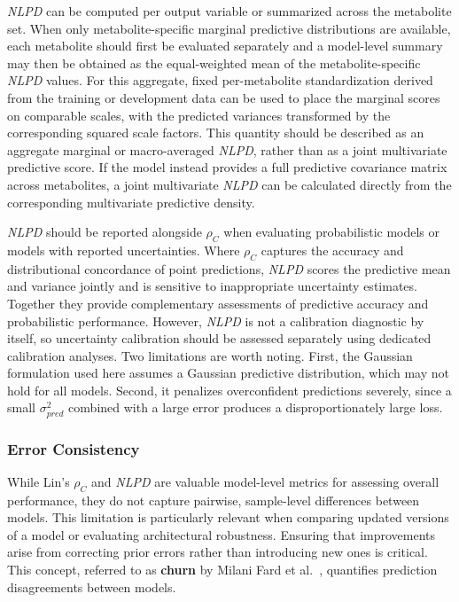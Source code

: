\textit{NLPD} can be computed per output variable or summarized across the metabolite set. When only metabolite-specific marginal predictive distributions are available, each metabolite should first be evaluated separately and a model-level summary may then be obtained as the equal-weighted mean of the metabolite-specific \textit{NLPD} values. For this aggregate, fixed per-metabolite standardization derived from the training or development data can be used to place the marginal scores on comparable scales, with the predicted variances transformed by the corresponding squared scale factors. This quantity should be described as an aggregate marginal or macro-averaged \textit{NLPD}, rather than as a joint multivariate predictive score. If the model instead provides a full predictive covariance matrix across metabolites, a joint multivariate \textit{NLPD} can be calculated directly from the corresponding multivariate predictive density.

\textit{NLPD} should be reported alongside $\rho_C$ when evaluating probabilistic models or models with reported uncertainties. Where $\rho_C$ captures the accuracy and distributional concordance of point predictions, \textit{NLPD} scores the predictive mean and variance jointly and is sensitive to inappropriate uncertainty estimates. Together they provide complementary assessments of predictive accuracy and probabilistic performance. However, \textit{NLPD} is not a calibration diagnostic by itself, so uncertainty calibration should be assessed separately using dedicated calibration analyses. Two limitations are worth noting. First, the Gaussian formulation used here assumes a Gaussian predictive distribution, which may not hold for all \DL models. Second, it penalizes overconfident predictions severely, since a small $\sigma^2_{pred}$ combined with a large error produces a disproportionately large loss.

\subsubsection{Error Consistency}\label{sec:Eval:subsec:RegMetrics:subsubsec:error con}
While Lin's $\rho_C$ and \textit{NLPD} are valuable model-level metrics for assessing overall performance, they do not capture pairwise, sample-level differences between models. This limitation is particularly relevant when comparing updated versions of a model or evaluating architectural robustness. Ensuring that improvements arise from correcting prior errors rather than introducing new ones is critical. This concept, referred to as \textbf{churn} by Milani Fard et al.~\cite{MilaniFard2016}, quantifies prediction disagreements between models.

